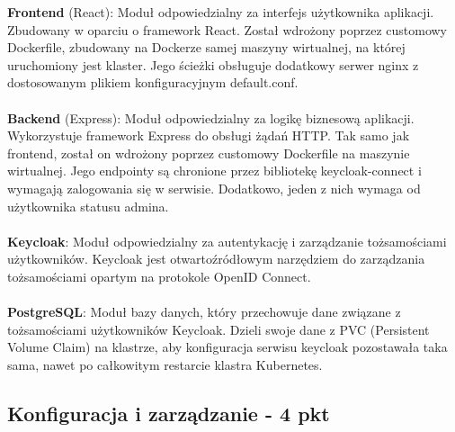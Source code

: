 \documentclass[12pt,a4paper]{article}
\begin{document}
\textbf{Frontend} (React): Moduł odpowiedzialny za interfejs użytkownika aplikacji. Zbudowany w oparciu o framework React. Został wdrożony poprzez customowy Dockerfile, zbudowany na Dockerze samej maszyny wirtualnej, na której uruchomiony jest klaster. Jego ścieżki obsługuje dodatkowy serwer nginx z dostosowanym plikiem konfiguracyjnym default.conf. \\
\\
\textbf{Backend} (Express): Moduł odpowiedzialny za logikę biznesową aplikacji. Wykorzystuje framework Express do obsługi żądań HTTP. Tak samo jak frontend, został on wdrożony poprzez customowy Dockerfile na maszynie wirtualnej. Jego endpointy są chronione przez bibliotekę keycloak-connect i wymagają zalogowania się w serwisie. Dodatkowo, jeden z nich wymaga od użytkownika statusu admina.\\
\\
\textbf{Keycloak}: Moduł odpowiedzialny za autentykację i zarządzanie tożsamościami użytkowników. Keycloak jest otwartoźródłowym narzędziem do zarządzania tożsamościami opartym na protokole OpenID Connect.\\
\\
\textbf{PostgreSQL}: Moduł bazy danych, który przechowuje dane związane z tożsamościami użytkowników Keycloak. Dzieli swoje dane z PVC (Persistent Volume Claim) na klastrze, aby konfiguracja serwisu keycloak pozostawała taka sama, nawet po całkowitym restarcie klastra Kubernetes.\\


\subsection{Konfiguracja i zarządzanie - 4 pkt}
\label{sec:NonFunctionalConditions}
\end{document}
